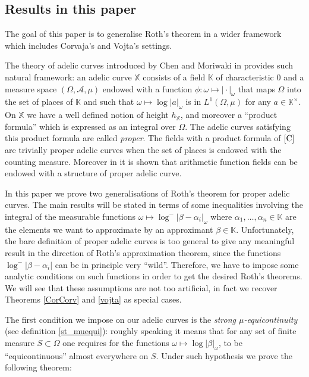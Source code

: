 \documentclass[10 pt,a4paper]{article}
\theoremstyle{plain}
\theoremstyle{definition}
\theoremstyle{named}
\begin{document}
\subsection{Results in this paper}
The goal of this paper is to generalise Roth's theorem  in a wider framework which includes Corvaja's and Vojta's settings.

The theory of  adelic curves introduced by Chen and Moriwaki in \cite{Ch-Mo} provides such natural framework:  an adelic curve $\mathbb X$ consists of a field $\mathbb K$ of characteristic $0$ and a measure space $(\Omega,\mathcal A, \mu)$ endowed with a function  $\phi:\omega\mapsto \vert\cdot \vert_{\omega}$ that maps $\Omega$ into the set of places of $\mathbb K$ and such that $\omega\mapsto\log|a|_\omega$ is  in $L^1(\Omega,\mu)$ for any $a\in\mathbb K^\times$. On $\mathbb X$ we have a well defined notion of height $h_{\mathbb X}$, and moreover a ``product formula'' which is expressed as an integral over $\Omega$. The adelic curves satisfying this product formula are called \emph{proper}. The fields with a product formula of $\cite{C}$ are trivially proper adelic curves when the set of places is endowed with the counting measure. Moreover in \cite[Section 3]{vo} it is shown that arithmetic function fields can be endowed with  a structure of proper adelic curve.

In this paper we prove two generalisations of Roth's theorem for proper adelic curves. The main results will be stated in terms of some inequalities involving the integral of the measurable functions $\omega\mapsto \log^-|\beta-\alpha_i|_\omega$  where $\alpha_1,\ldots, \alpha_n\in\mathbb K$ are the elements we want to approximate by an approximant $\beta\in\mathbb K$. Unfortunately, the bare definition of proper adelic curves is too general to give any meaningful result in the direction of Roth's approximation theorem, since  the functions $\log^-|\beta-\alpha_i|$ can be in principle very ``wild''. Therefore, we have to impose some analytic conditions on such functions in order to get the desired Roth's theorems. We will see that these assumptions are not too artificial, in fact we recover Theorems \ref{CorCorv} and \ref{vojta} as special cases. 



The first condition we impose  on our adelic curves is the \emph{strong $\mu$-equicontinuity} (see definition \ref{st_muequi}): roughly speaking it  means that for any set of finite measure $S\subset\Omega$ one requires for the functions $\omega\mapsto \log|\beta|_{\omega}$, to be ``equicontinuous'' almost everywhere  on $S$. Under such hypothesis we prove the following theorem:
\end{document}

